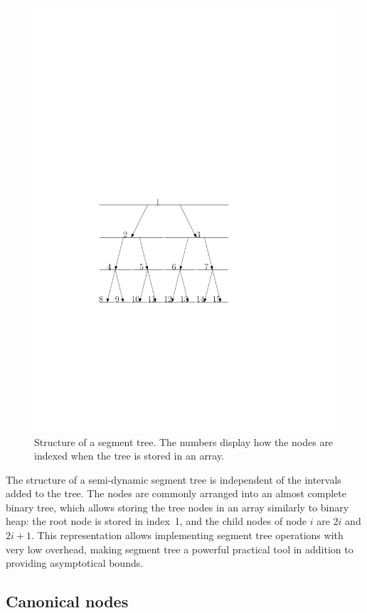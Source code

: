 \documentclass[english,gradu]{tktltiki2018}
\begin{document}
\begin{figure}\centering
	\includegraphics[scale=0.7,page=1]{fig/segtree}
	\caption{Structure of a segment tree. The numbers display how the nodes are indexed when the tree is stored in an array.}\label{fig:segtree}
\end{figure}

The structure of a semi-dynamic segment tree is independent of the intervals added to the tree.
The nodes are commonly arranged into an almost complete binary tree, which allows storing the tree nodes in an array similarly to binary heap:
the root node is stored in index~1, and the child nodes of node $i$ are $2i$ and $2i+1$.
This representation allows implementing segment tree operations with very low overhead, making segment tree a powerful practical tool in addition to providing asymptotical bounds.

\subsection{Canonical nodes}
\end{document}
